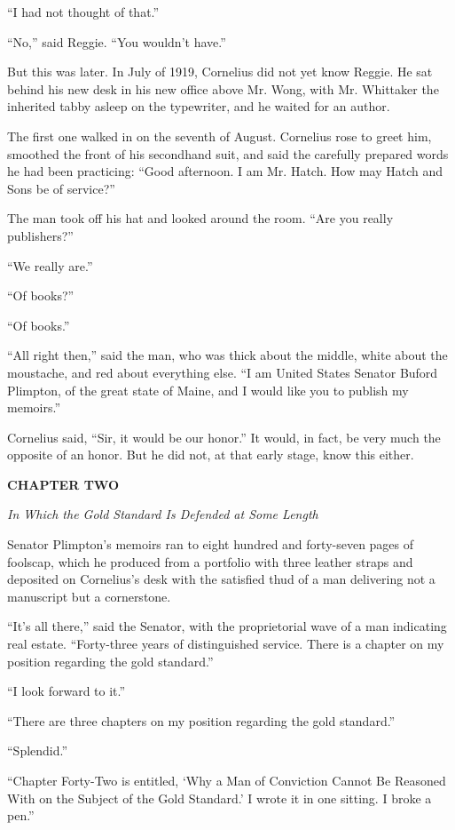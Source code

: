 \documentclass[12pt,openright]{book}
\begin{document}
“I had not thought of that.”

“No,” said Reggie. “You wouldn’t have.”

But this was later. In July of 1919, Cornelius did not yet know Reggie. He sat behind his new desk in his new office above Mr. Wong, with Mr. Whittaker the inherited tabby asleep on the typewriter, and he waited for an author.

The first one walked in on the seventh of August. Cornelius rose to greet him, smoothed the front of his secondhand suit, and said the carefully prepared words he had been practicing: “Good afternoon. I am Mr. Hatch. How may Hatch and Sons be of service?”

The man took off his hat and looked around the room. “Are you really publishers?”

“We really are.”

“Of books?”

“Of books.”

“All right then,” said the man, who was thick about the middle, white about the moustache, and red about everything else. “I am United States Senator Buford Plimpton, of the great state of Maine, and I would like you to publish my memoirs.”

Cornelius said, “Sir, it would be our honor.” It would, in fact, be very much the opposite of an honor. But he did not, at that early stage, know this either.

\textbf{CHAPTER TWO}

\textit{In Which the Gold Standard Is Defended at Some Length}

Senator Plimpton’s memoirs ran to eight hundred and forty-seven pages of foolscap, which he produced from a portfolio with three leather straps and deposited on Cornelius’s desk with the satisfied thud of a man delivering not a manuscript but a cornerstone.

“It’s all there,” said the Senator, with the proprietorial wave of a man indicating real estate. “Forty-three years of distinguished service. There is a chapter on my position regarding the gold standard.”

“I look forward to it.”

“There are three chapters on my position regarding the gold standard.”

“Splendid.”

“Chapter Forty-Two is entitled, ‘Why a Man of Conviction Cannot Be Reasoned With on the Subject of the Gold Standard.’ I wrote it in one sitting. I broke a pen.”
\end{document}

